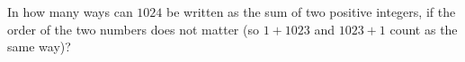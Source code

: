 In how many ways can $1024$ be written as the sum of two positive integers, if the order of the two numbers does not matter (so $1+1023$ and $1023+1$ count as the same way)?
